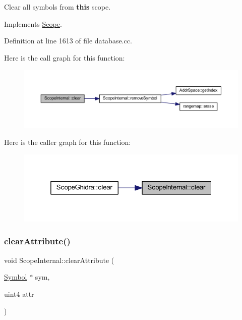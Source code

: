 Clear all symbols from {\bfseries{this}} scope. 



Implements \mbox{\hyperlink{class_scope_a9bfa2b0a98ba3ceeafd5a1e7ad2e2c21}{Scope}}.



Definition at line 1613 of file database.\+cc.

Here is the call graph for this function\+:
\nopagebreak
\begin{figure}[H]
\begin{center}
\leavevmode
\includegraphics[width=350pt]{class_scope_internal_a3d5c9c8e68da7f36ae7e0e228b4734d2_cgraph}
\end{center}
\end{figure}
Here is the caller graph for this function\+:
\nopagebreak
\begin{figure}[H]
\begin{center}
\leavevmode
\includegraphics[width=319pt]{class_scope_internal_a3d5c9c8e68da7f36ae7e0e228b4734d2_icgraph}
\end{center}
\end{figure}
\mbox{\label{class_scope_internal_a8c42cfc4ea5d359bd11d1251ef8d21d7}} 
\subsubsection{\texorpdfstring{clearAttribute()}{clearAttribute()}}
{\footnotesize\ttfamily void Scope\+Internal\+::clear\+Attribute (\begin{DoxyParamCaption}\item[{\mbox{\hyperlink{class_symbol}{Symbol}} $\ast$}]{sym,  }\item[{uint4}]{attr }\end{DoxyParamCaption})\hspace{0.3cm}{\ttfamily [virtual]}}



